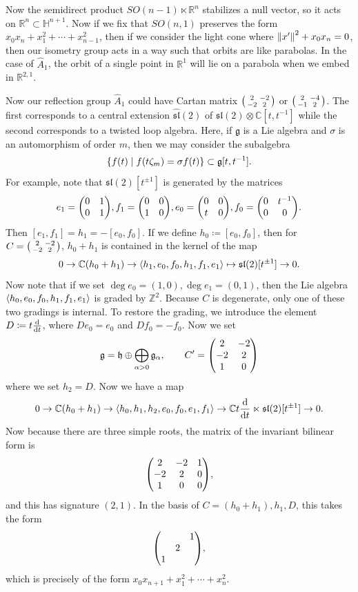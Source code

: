 \documentclass[leqno, openany]{memoir}
\theoremstyle{definition}
\theoremstyle{remark}
\theoremstyle{plain}
\theoremstyle{definition}
\theoremstyle{remark}
\newcommand{\R}{\mathbb{R}}
\newcommand{\C}{\mathbb{C}}
\renewcommand{\H}{\mathbb{H}}
\newcommand{\Z}{\mathbb{Z}}
\newcommand{\mf}[1]{\mathfrak{#1}}
\newcommand{\wh}[1]{\widehat{#1}}
\begin{document}
Now the semidirect product $SO(n-1) \ltimes \R^n$ stabilizes a null vector, so it acts on $\R^n \subset \H^{n+1}$. Now if we fix that $SO(n,1)$ preserves the form $x_0 x_n + x_1^2 + \cdots + x_{n-1}^2$, then if we consider the light cone where $\norm{x'}^2 + x_0 x_n = 0$, then our isometry group acts in a way such that orbits are like parabolas. In the case of $\wh{A}_1$, the orbit of a single point in $\R^1$ will lie on a parabola when we embed in $\R^{2,1}$.

Now our reflection group $\wh{A}_1$ could have Cartan matrix $\begin{psmallmatrix} 2 & -2 \\ -2 & 2 \end{psmallmatrix}$ or $\begin{psmallmatrix} 2 & -4 \\ -1 & 2 \end{psmallmatrix}$. The first corresponds to a central extension $\wh{\mf{sl}}(2)$ of $\mf{sl}(2) \otimes \C[t,t^{-1}]$ while the second corresponds to a twisted loop algebra. Here, if $\mf{g}$ is a Lie algebra and $\sigma$ is an automorphism of order $m$, then we may consider the subalgebra
\[ \qty{f(t) \mid f(t \zeta_m) = \sigma f(t) } \subset \mf{g}[t,t^{-1}]. \]
For example, note that $\mf{sl}(2)[t^{\pm 1}]$ is generated by the matrices
\[ e_1 = \mqty(0 & 1 \\ 0 & 1), f_1 = \mqty(0 & 0 \\ 1 & 0), e_0 = \mqty(0 & 0 \\ t & 0), f_0 = \mqty(0 & t^{-1} \\ 0 & 0). \]
Then $[e_1, f_1] = h_1 = -[e_0, f_0]$. If we define $h_0 \coloneqq [e_0, f_0]$, then for $C = \begin{psmallmatrix} 2 & -2 \\ -2 & 2 \end{psmallmatrix}$, $h_0 + h_1$ is contained in the kernel of the map
\[ 0 \to \C(h_0 + h_1) \to \ev{h_1, e_0, f_0, h_1, f_1, e_1} \mapsto \mf{sl}(2) [t^{\pm 1}] \to 0. \]
Now note that if we set $\deg e_0 = (1,0), \deg e_1 = (0,1)$, then the Lie algebra $\ev{h_0, e_0, f_0, h_1, f_1, e_1}$ is graded by $\Z^2$. Because $C$ is degenerate, only one of these two gradings is internal. To restore the grading, we introduce the element $D \coloneqq t \dv{t}$, where $D e_0 = e_0$ and $D f_0 = -f_0$. Now we set
\[ \mf{g} = \mf{h} \oplus \bigoplus_{\alpha > 0} \mf{g}_{\alpha}, \qquad C' = \mqty(2 & -2 \\ -2 & 2 \\ 1 & 0) \]
where we set $h_2 = D$. Now we have a map
\[ 0 \to \C(h_0 + h_1) \to \ev{h_0, h_1, h_2, e_0, f_0, e_1, f_1} \to \C t \dv{t} \ltimes \mf{sl}(2)[t^{\pm 1}] \to 0. \]
Now because there are three simple roots, the matrix of the invariant bilinear form is
\[ \mqty(2 & -2 & 1 \\ -2 & 2 & 0 \\ 1 & 0 & 0), \]
and this has signature $(2,1)$. In the basis of $C=(h_0+h_1), h_1, D$, this takes the form
\[ \mqty( & & 1 \\ & 2 & \\ 1 & & ), \]
which is precisely of the form $x_0 x_{n+1} + x_1^2 + \cdots + x_n^2$.
\end{document}
